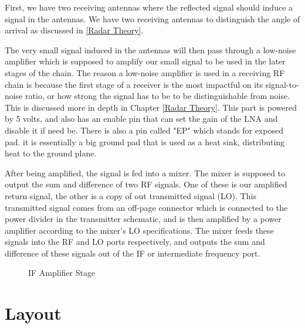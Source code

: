 First, we have two receiving antennas where the reflected signal should induce a signal in the antennas. We have two
receiving antennas to distinguish the angle of arrival as discussed in \ref{Radar Theory}.

The very small signal induced in the antennas will then pass through a low-noise amplifier which is supposed to amplify our small
signal to be used in the later stages of the chain. The reason a low-noise amplifier is used in a receiving RF chain is because
the first stage of a receiver is the most impactful on its signal-to-noise ratio, or how strong the signal has to be to be
distinguishable from noise. This is discussed more in depth in Chapter \ref{Radar Theory}. This part is powered by 5 volts, and
also has an enable pin that can set the gain of the LNA and disable it if need be. There is also a pin called "EP" which stands
for exposed pad. it is essentially a big ground pad that is used as a heat sink, distributing heat to the ground plane.

After being amplified, the signal is fed into a mixer. The mixer is supposed to output the sum and difference of two RF signals.
One of these is our amplified return signal, the other is a copy of out transmitted signal (LO). This transmitted signal comes from
an off-page connector which is connected to the power divider in the transmitter schematic, and is then amplified by a power
amplifier according to the mixer's LO specifications. The mixer feeds these signals into the RF and LO ports respectively, and
outputs the sum and difference of these signals out of the IF or intermediate frequency port.

\begin{figure}[H]
  \centering
\caption{IF Amplifier Stage}
\label{img:ifamplifier}
\end{figure}



\section{Layout}
\